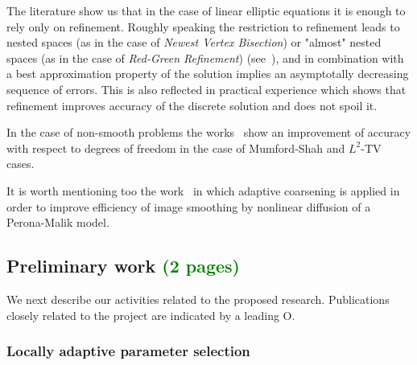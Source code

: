 \documentclass[enabledeprecatedfontcommands,cleardoublepage=empty,headsepline,twoside,11pt,DIV=15,BCOR=12mm,final]{scrartcl}
\begin{document}
The literature show us that in the case of linear elliptic equations it is enough to rely only on refinement. Roughly speaking the restriction to refinement leads to nested spaces (as in the case of \emph{Newest Vertex Bisection}) or "almost" nested spaces (as in the case of \emph{Red-Green Refinement}) (see~\cite{Verfurth:96}), and in combination with a best approximation property of the solution implies an asymptotally decreasing sequence of errors. This is also reflected in practical experience which shows that refinement improves accuracy of the discrete solution and does not spoil it.

In the case  of non-smooth problems the works~\cite{GuMoNo,Bar2015} show an improvement of accuracy with respect to degrees of freedom in the case of Mumford-Shah and $L^2$-TV cases. %

It is worth mentioning too  the work~\cite{BaeMik} in which adaptive coarsening is applied in order to improve efficiency of image smoothing by nonlinear diffusion of a Perona-Malik model.




\subsection{Preliminary work \textcolor{green}{(2 pages)}}\label{sec:prelim}

We next describe our activities related to the proposed research. Publications closely related to the project are indicated by a leading O.
\subsubsection{Locally adaptive parameter selection}

\end{document}
